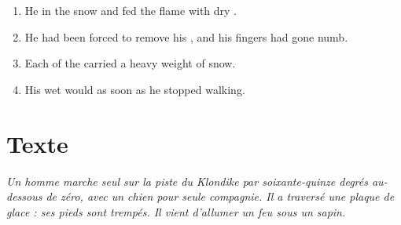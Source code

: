 \documentclass{fiche}
\begin{document}
\begin{anglais}
\begin{enumerate}[label=\arabic*.,itemsep=2mm,leftmargin=*]
  \item He  in the snow and fed the flame with dry .
  \item He had been forced to remove his , and his fingers had gone numb.
  \item Each  of the  carried a heavy weight of snow.
  \item His wet  would  as soon as he stopped walking.
\end{enumerate}
\end{anglais}

\newpage
\section{Texte}

\noindent\small\textit{Un homme marche seul sur la piste du Klondike par soixante-quinze
degrés au-dessous de zéro, avec un chien pour seule compagnie. Il a traversé une plaque de
glace : ses pieds sont trempés. Il vient d'allumer un feu sous un sapin.}\normalsize
\end{document}
